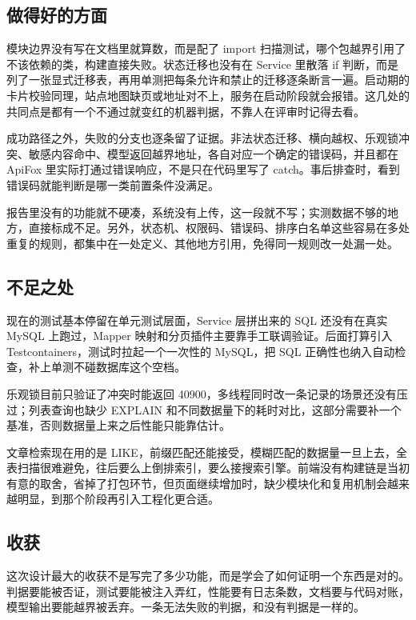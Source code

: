 \documentclass[zihao=-4,UTF8,openany]{ctexart}
\renewcommand{\_}{\textunderscore\allowbreak}
\begin{document}
\subsection*{\texorpdfstring{\textbf{做得好的方面}}{做得好的方面}}\label{ux505aux5bf9ux4e86ux4ec0ux4e48}

模块边界没有写在文档里就算数，而是配了 import 扫描测试，哪个包越界引用了不该依赖的类，构建直接失败。状态迁移也没有在 Service 里散落 if 判断，而是列了一张显式迁移表，再用单测把每条允许和禁止的迁移逐条断言一遍。启动期的卡片校验同理，站点地图缺页或地址对不上，服务在启动阶段就会报错。这几处的共同点是都有一个不通过就变红的机器判据，不靠人在评审时记得去看。

成功路径之外，失败的分支也逐条留了证据。非法状态迁移、横向越权、乐观锁冲突、敏感内容命中、模型返回越界地址，各自对应一个确定的错误码，并且都在 ApiFox 里实际打通过错误响应，不是只在代码里写了 catch。事后排查时，看到错误码就能判断是哪一类前置条件没满足。

报告里没有的功能就不硬凑，系统没有上传，这一段就不写；实测数据不够的地方，直接标成不足。另外，状态机、权限码、错误码、排序白名单这些容易在多处重复的规则，都集中在一处定义、其他地方引用，免得同一规则改一处漏一处。

\subsection*{\texorpdfstring{\textbf{不足之处}}{不足之处}}\label{ux8fd8ux9700ux8981ux6539ux8fdbux4ec0ux4e48}

现在的测试基本停留在单元测试层面，Service 层拼出来的 SQL 还没有在真实 MySQL 上跑过，Mapper 映射和分页插件主要靠手工联调验证。后面打算引入 Testcontainers，测试时拉起一个一次性的 MySQL，把 SQL 正确性也纳入自动检查，补上单测不碰数据库这个空档。

乐观锁目前只验证了冲突时能返回 40900，多线程同时改一条记录的场景还没有压过；列表查询也缺少 EXPLAIN 和不同数据量下的耗时对比，这部分需要补一个基准，否则数据量上来之后性能只能靠估计。

文章检索现在用的是 LIKE，前缀匹配还能接受，模糊匹配的数据量一旦上去，全表扫描很难避免，往后要么上倒排索引，要么接搜索引擎。前端没有构建链是当初有意的取舍，省掉了打包环节，但页面继续增加时，缺少模块化和复用机制会越来越明显，到那个阶段再引入工程化更合适。

\subsection*{\texorpdfstring{\textbf{收获}}{收获}}\label{ux6536ux83b7}

这次设计最大的收获不是写完了多少功能，而是学会了如何证明一个东西是对的。判据要能被否证，测试要能被注入弄红，性能要有日志条数，文档要与代码对账，模型输出要能越界被丢弃。一条无法失败的判据，和没有判据是一样的。
\end{document}
